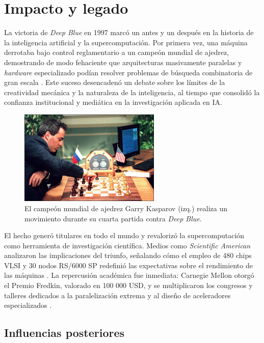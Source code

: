 \documentclass[a4paper, 12pt]{article}
\begin{document}
\section{Impacto y legado}

La victoria de \textit{Deep Blue} en 1997 marcó un antes y un 
después en la historia de la inteligencia artificial y la 
supercomputación. Por primera vez, una máquina derrotaba bajo 
control reglamentario a un campeón mundial de ajedrez, 
demostrando de modo fehaciente que arquitecturas masivamente 
paralelas y \emph{hardware} especializado podían resolver 
problemas de búsqueda combinatoria de gran escala 
\cite{ibmHistoryDeepBlue,greenemeier2017}. Este suceso desencadenó un 
debate sobre los límites de la creatividad mecánica y la naturaleza 
de la inteligencia, al tiempo que consolidó la confianza 
institucional y mediática en la investigación aplicada en IA.

\begin{figure}[h]
    \centering
    \includegraphics[width=0.6\textwidth]{assets/deepbluevskasparov.jpg}
    \caption{El campeón mundial de ajedrez Garry Kasparov (izq.) realiza un movimiento durante su cuarta partida contra \emph{Deep Blue}.}
    \label{fig:deepbluevskasparov}
\end{figure}


El hecho generó titulares en todo el mundo y 
revalorizó la supercomputación como herramienta de investigación 
científica. Medios como \emph{Scientific American} analizaron las 
implicaciones del triunfo, señalando cómo el empleo de 480 chips 
VLSI y 30 nodos RS/6000 SP redefinió las expectativas sobre el 
rendimiento de las máquinas \cite{greenemeier2017}. La repercusión 
académica fue inmediata: Carnegie Mellon otorgó el Premio Fredkin, 
valorado en 100 000 USD, y se multiplicaron los congresos y 
talleres dedicados a la paralelización extrema y al diseño de 
aceleradores especializados \cite{ibmHistoryDeepBlue}.

\subsection{Influencias posteriores}
\end{document}
